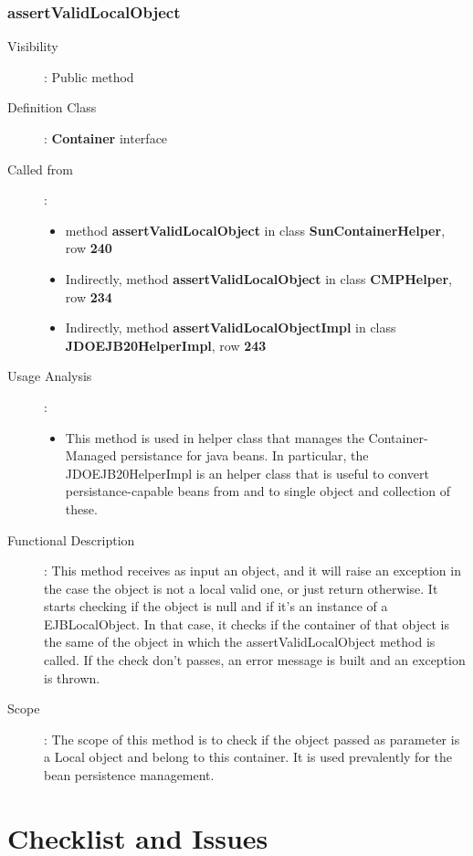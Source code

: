\documentclass[11pt, a4paper,titlepage]{article}
\begin{document}
	 \subsubsection{assertValidLocalObject}
	 \begin{description}
	 	\item[Visibility]: Public method
	 	\item[Definition Class]: \textbf{Container} interface
	 	\item[Called from]: 
	 	\begin{itemize}
	 		\item method \textbf{assertValidLocalObject} in class \textbf{SunContainerHelper}, row \textbf{240}
	 		\item Indirectly, method \textbf{assertValidLocalObject} in class \textbf{CMPHelper}, row \textbf{234}
	 		
	 		\item Indirectly, method \textbf{assertValidLocalObjectImpl} in class \textbf{JDOEJB20HelperImpl}, row \textbf{243}
	 	\end{itemize}
	 	\item[Usage Analysis]: 
	 	\begin{itemize}
	 		\item This method is used in helper class that manages the Container-Managed persistance for java beans. \newline In particular, the JDOEJB20HelperImpl is an helper class that is useful to convert persistance-capable beans from and to single object and collection of these.
	 		
	 	\end{itemize} 
	 	\item[Functional Description]: This method receives as input an object, and it will raise an exception in the case the object is not a local valid one, or just return otherwise. It starts checking if the object is null and if it's an instance of a EJBLocalObject. In that case, it checks if the container of that object is the same of the object in which the assertValidLocalObject method is called. If the check don't passes, an error message is built and an exception is thrown.
	 	\item[Scope]: The scope of this method is to check if the object passed as parameter is a Local object and belong to this container. It is used prevalently for the bean persistence management.  
	 \end{description}
\newpage
\section{Checklist and Issues}
\end{document}
